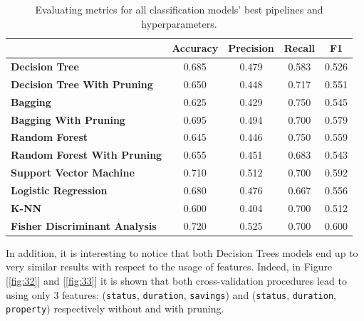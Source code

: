 \documentclass[letterpaper]{article}
\begin{document}
	\begin{table}[h]
		\centering
			\begin{tabular}{|l|c|c|c|c|}
				\hline
				&	\textbf{Accuracy}	& \textbf{Precision} &	\textbf{Recall	}&\textbf{F1}\\
				\hline
				\textbf{Decision Tree	}&0.685&	0.479&	0.583&	0.526\\
				\hline
				\textbf{Decision Tree With Pruning} &	0.650&	0.448&	0.717&	0.551\\
				\hline
				\textbf{Bagging }&	0.625&	0.429&	0.750&	0.545\\
				\hline
				\textbf{Bagging With Pruning}&	0.695&	0.494&	0.700&	0.579\\
				\hline
				\textbf{Random Forest }&	0.645&	0.446&	0.750&	0.559\\
				\hline
				\textbf{Random Forest With Pruning}&	0.655&	0.451&	0.683&	0.543\\
				\hline
				\textbf{Support Vector Machine}&	0.710&	0.512&	0.700&	0.592\\
				\hline
				\textbf{Logistic Regression}&	0.680&	0.476&	0.667&	0.556\\
				\hline
				\textbf{K-NN}&0.600&	0.404&	0.700&	0.512\\
				\hline
				\textbf{Fisher Discriminant Analysis}&	0.720&	0.525&	0.700&	0.600\\
				\hline
			\end{tabular}
			\caption{\label{tab:1} Evaluating metrics for all classification models' best pipelines and hyperparameters.}
	\end{table}
	In addition, it is interesting to notice that both Decision Trees models end up to very similar results with respect to the usage of features. Indeed, in Figure [\ref{fig:32}] and [\ref{fig:33}] it is shown that both cross-validation procedures lead to using only $3$ features: (\texttt{status}, \texttt{duration}, \texttt{savings}) and (\texttt{status}, \texttt{duration}, \texttt{property}) respectively without and with pruning. \par
\end{document}
